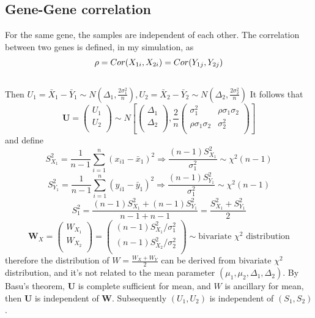 \documentclass[12pt,oneside]{book}
\begin{document}
\subsection*{Gene-Gene correlation}
For the same gene, the samples are independent of each other. The correlation between two genes is defined, in my simulation, as 
\begin{align}\label{correlation}
\rho & = Cor(X_{1i}, X_{2i}) =  Cor(Y_{1j}, Y_{2j}) \\ \notag
\end{align}
Then $U_1= \bar{X}_1-\bar{Y}_1\sim N(\Delta_1, \frac{2\sigma_1^2}{n}),  U_2 = \bar{X}_2-\bar{Y}_2\sim N(\Delta_2, \frac{2\sigma_2^2}{n})$ 
It follows that 
\[ \bm U =\left( \begin{array}{c}
U_1\\
U_2\\
\end{array}\right)
\sim N\left[
\left(\begin{array}{c}
\Delta_1\\
\Delta_2\\
\end{array} \right), 
\frac{2}{n}\left(
\begin{array}{cc}
\sigma_1^2 &\rho \sigma_1\sigma_2 \\
\rho \sigma_1 \sigma_2 & 	\sigma_2^2 \\
\end{array}
\right)
 \right]
\]
and define
\[S_{X_1}^2 = \frac{1}{n-1}\sum_{i=1}^n(x_{i1}-\bar{x}_1)^2 \Rightarrow \frac{(n-1)S_{X_1}^2}{\sigma_1^2} \sim \chi^2(n-1)\]
\[S_{Y_1}^2 = \frac{1}{n-1}\sum_{i=1}^n(y_{i1}-\bar{y}_1)^2 \Rightarrow \frac{(n-1)S_{Y_1}^2}{\sigma_1^2} \sim \chi^2(n-1)\]
\[S_1^2 = \frac{(n-1)S_{X_1}^2 + (n-1)S_{Y_1}^2}{n-1 + n-1} = \frac{S_{X_1}^2 + S_{Y_1}^2}{2}\]
\[
\bm W_X =\left( \begin{array}{c}
W_{X_1}\\
W_{X_2}\\
\end{array}\right)
=
\left( \begin{array}{c}
(n-1)S_{X_1}^2/\sigma_1^2\\
(n-1)S_{X_2}^2/\sigma^2_2\\
\end{array}\right)
\sim \text{bivariate } \chi^2 \text{ distribution}
\]
therefore  the distribution of $W = \frac{W_X + W_Y}{2}$ can be derived from bivariate $\chi^2$ distribution, and it's not related to the mean parameter $(\mu_1, \mu_2, \Delta_1, \Delta_2)$. By Basu's theorem, $\bm U$ is complete sufficient for mean, and $W$ is ancillary for mean, then $\bm U$ is independent of $\bm W$. Subsequently $(U_1, U_2)$ is independent of $(S_1, S_2)$. 
\end{document}
